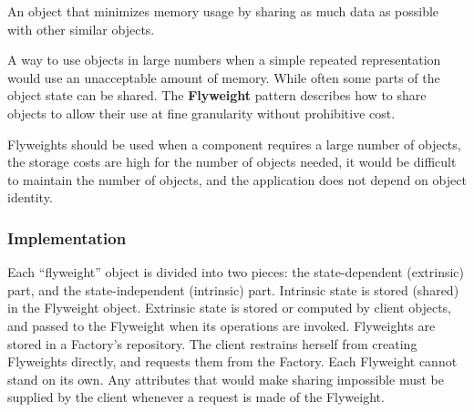 \begin{summary}
An object that minimizes memory usage by sharing as much data as possible with
other similar objects.

A way to use objects in large numbers when a simple repeated representation
would use an unacceptable amount of memory. While often some parts of the
object state can be shared. The {\bf Flyweight} pattern describes how to share
objects to allow their use at fine granularity without prohibitive cost. 

Flyweights should be used when a component requires a large number of objects,
the storage costs are high for the number of objects needed, it would be
difficult to maintain the number of objects, and the application does not
depend on object identity.
\end{summary}

\subsubsection{Implementation}
Each ``flyweight'' object is divided into two pieces: the state-dependent
(extrinsic) part, and the state-independent (intrinsic) part. Intrinsic state
is stored (shared) in the Flyweight object. Extrinsic state is stored or
computed by client objects, and passed to the Flyweight when its operations are
invoked. Flyweights are stored in a Factory's repository. The client restrains
herself from creating Flyweights directly, and requests them from the Factory.
Each Flyweight cannot stand on its own. Any attributes that would make sharing
impossible must be supplied by the client whenever a request is made of the
Flyweight.


